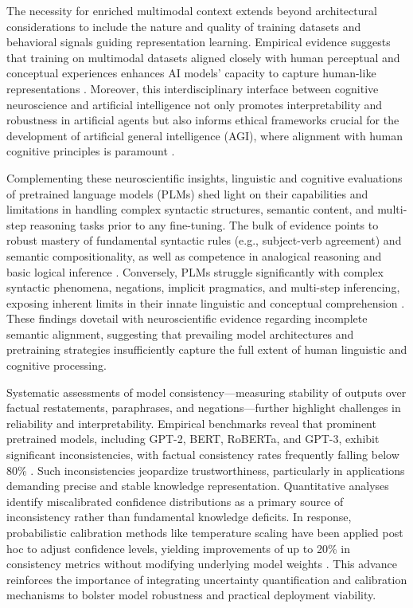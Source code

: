 \documentclass[11pt]{article}
\begin{document}
The necessity for enriched multimodal context extends beyond architectural considerations to include the nature and quality of training datasets and behavioral signals guiding representation learning. Empirical evidence suggests that training on multimodal datasets aligned closely with human perceptual and conceptual experiences enhances AI models’ capacity to capture human-like representations \cite{ref4,ref5}. Moreover, this interdisciplinary interface between cognitive neuroscience and artificial intelligence not only promotes interpretability and robustness in artificial agents but also informs ethical frameworks crucial for the development of artificial general intelligence (AGI), where alignment with human cognitive principles is paramount \cite{ref2,ref4,ref5}.

Complementing these neuroscientific insights, linguistic and cognitive evaluations of pretrained language models (PLMs) shed light on their capabilities and limitations in handling complex syntactic structures, semantic content, and multi-step reasoning tasks prior to any fine-tuning. The bulk of evidence points to robust mastery of fundamental syntactic rules (e.g., subject-verb agreement) and semantic compositionality, as well as competence in analogical reasoning and basic logical inference \cite{ref34}. Conversely, PLMs struggle significantly with complex syntactic phenomena, negations, implicit pragmatics, and multi-step inferencing, exposing inherent limits in their innate linguistic and conceptual comprehension \cite{ref34}. These findings dovetail with neuroscientific evidence regarding incomplete semantic alignment, suggesting that prevailing model architectures and pretraining strategies insufficiently capture the full extent of human linguistic and cognitive processing.

Systematic assessments of model consistency—measuring stability of outputs over factual restatements, paraphrases, and negations—further highlight challenges in reliability and interpretability. Empirical benchmarks reveal that prominent pretrained models, including GPT-2, BERT, RoBERTa, and GPT-3, exhibit significant inconsistencies, with factual consistency rates frequently falling below 80\% \cite{ref35}. Such inconsistencies jeopardize trustworthiness, particularly in applications demanding precise and stable knowledge representation. Quantitative analyses identify miscalibrated confidence distributions as a primary source of inconsistency rather than fundamental knowledge deficits. In response, probabilistic calibration methods like temperature scaling have been applied post hoc to adjust confidence levels, yielding improvements of up to 20\% in consistency metrics without modifying underlying model weights \cite{ref35}. This advance reinforces the importance of integrating uncertainty quantification and calibration mechanisms to bolster model robustness and practical deployment viability.
\end{document}

